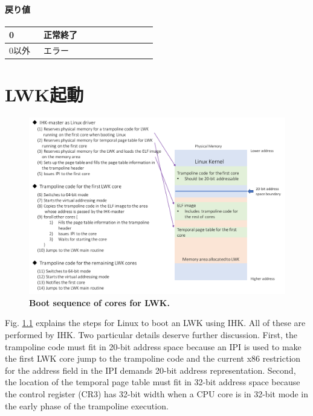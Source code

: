 \documentclass[twoside,11pt,fleqn]{book}
\begin{document}
\subsubsection*{戻り値} 
\begin{table}[!ht]
\footnotesize
\begin{tabular}{|p{0.20\linewidth}|p{0.66\linewidth}|} \hline
0&正常終了\\ \hline
0以外&エラー\\ \hline
\end{tabular}
\vspace{-0em}
\end{table}
\FloatBarrier

\chapter{LWK起動}

\begin{figure}[htb]
\centering
\includegraphics[width=14cm]{figs/booting-sequence.pdf}
\vspace{-0em}\caption{\textbf{Boot sequence of cores for LWK.}}
\label{fig:booting-sequence}
\vspace{-0em}
\end{figure}
Fig. \ref{fig:booting-sequence} explains the steps for Linux to boot an LWK using IHK.
All of these are performed by IHK. Two particular details deserve further discussion.
First, the trampoline code must fit in 20-bit address space because an IPI is used to make the first LWK core jump to the trampoline code and the current x86 restriction for the address field in the IPI demands 20-bit address representation.
%
Second, the location of the temporal page table must fit in 32-bit address space because the control register (CR3) has 32-bit width when a CPU core is in 32-bit mode in the early phase of the trampoline execution.
\end{document}
